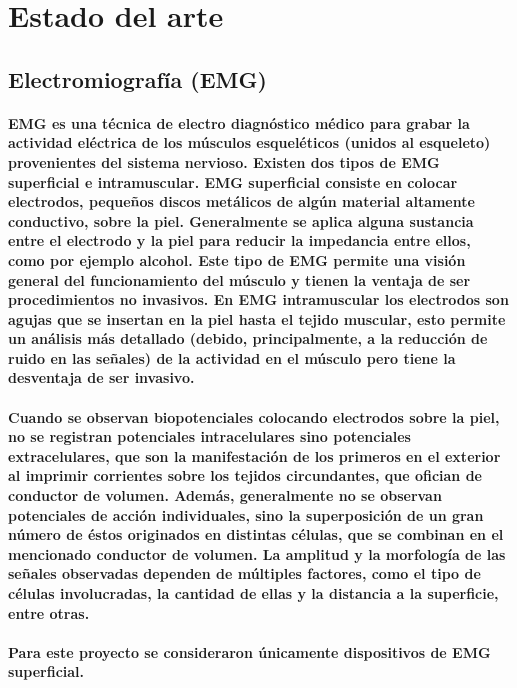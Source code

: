 \documentclass{article}
\begin{document}
\section{Estado del arte}
\subsection{Electromiografía (EMG)}
\paragraph{
EMG es una técnica de electro diagnóstico médico para grabar la actividad eléctrica de los músculos esqueléticos (unidos al esqueleto) provenientes del sistema nervioso. Existen dos tipos de EMG superficial e intramuscular. EMG superficial consiste en colocar electrodos, pequeños discos metálicos de algún material altamente conductivo, sobre la piel. Generalmente se aplica alguna sustancia entre el electrodo y la piel para reducir la impedancia entre ellos, como por ejemplo alcohol. Este tipo de EMG permite una visión general del funcionamiento del músculo y tienen la ventaja de ser procedimientos no invasivos. En EMG intramuscular los electrodos son agujas que se insertan en la piel hasta el tejido muscular, esto permite un análisis más detallado (debido, principalmente, a la reducción de ruido en las señales) de la actividad en el músculo pero tiene la desventaja de ser invasivo.
}
\paragraph{
Cuando se observan biopotenciales colocando electrodos sobre la piel, no se registran potenciales intracelulares sino potenciales extracelulares, que son la manifestación de los primeros en el exterior al imprimir
corrientes sobre los tejidos circundantes, que ofician de conductor de volumen. Además, generalmente no se observan potenciales de acción individuales, sino la superposición de un gran número de éstos originados en distintas células, que se combinan en el mencionado conductor de volumen. La amplitud y la morfología de las señales observadas dependen de múltiples factores, como el tipo de células involucradas, la cantidad de ellas y la distancia a la superficie, entre otras. \cite{haberman2016}
}
\paragraph{
Para este proyecto se consideraron únicamente dispositivos de EMG superficial.
}
\end{document}
